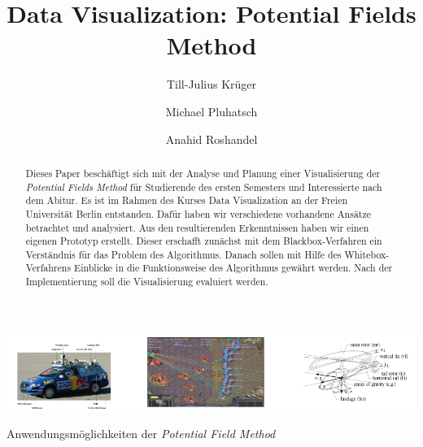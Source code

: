 \documentclass[sigchi, review]{acmart}
\begin{document}
\title{Data Visualization: Potential Fields Method}

 \author[Krüger]{Till-Julius Krüger}
 \email{}

 \author[Pluhatsch]{Michael Pluhatsch}
 \email{}

 \author[Roshandel]{Anahid Roshandel}
 \email{}



\begin{abstract}

Dieses Paper beschäftigt sich mit der Analyse und Planung einer Visualisierung der \textit{Potential Fields Method} für Studierende des ersten Semesters und Interessierte nach dem Abitur. Es ist im Rahmen des Kurses Data Visualization an der Freien Universität Berlin entstanden. Dafür haben wir  verschiedene vorhandene Ansätze betrachtet und analysiert. Aus den resultierenden Erkenntnissen haben wir einen eigenen Prototyp erstellt. Dieser erschafft zunächst mit dem Blackbox-Verfahren ein Verständnis für das Problem des Algorithmus. Danach sollen mit Hilfe des Whitebox-Verfahrens Einblicke in die Funktionsweise des Algorithmus gewährt werden. Nach der Implementierung soll die Visualisierung evaluiert werden.
\end{abstract}



\begin{teaserfigure}
  \includegraphics[width=\textwidth]{img/teaser}
  \caption{Anwendungsmöglichkeiten der \textit{Potential Field Method}~\cite{hagelback2012potential}\cite{montemerlo2008junior}\cite{paul2008uav}}
  \label{fig:teaser}
\end{teaserfigure}


\maketitle





%

\end{document}
